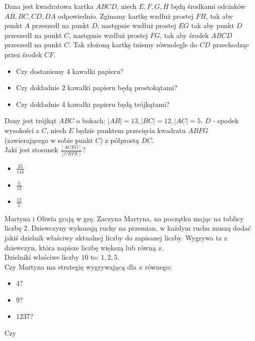 \documentclass[12pt, a4paper]{article}
\newcommand{\question}[1]{\normalitem \begin{samepage}#1 \end{samepage}}
\newcommand{\questionwithasterix}[1]{ \asterixitem \begin{samepage}#1 \vspace{6cm}\end{samepage}}
\begin{document}
\begin{enumerate}
    \question {
        Dana jest kwadratowa kartka $ABCD$, niech $E, F, G, H$ będą środkami odcinków $AB, BC, CD, DA$ odpowiednio.
        Zginamy kartkę wzdłuż prostej $FH$, tak aby punkt $A$ przeszedł na punkt $D$, następnie wzdłuż prostej $EG$ tak aby punkt $D$ przeszedł na punkt $C$, następnie wzdłuż prostej $FG$, tak aby środek $ABCD$ przeszedł na punkt $C$. Tak złożoną kartkę tniemy równolegle do $CD$ przechodząc przez środek $CF$.

		\begin{itemize}
			\item Czy dostaniemy $4$ kawałki papieru?
			\item Czy dokładnie $2$ kawałki papieru będą prostokątami?
			\item Czy dokładnie 4 kawałki papieru będą trójkątami?
		\end{itemize}
	}
	
	\questionwithasterix {
		Dany jest trójkąt $ABC$ o bokach: $|AB| = 13, |BC| = 12, |AC| = 5$. 
        $D$ - spodek wysokości z $C$, niech $E$ będzie punktem przecięcia kwadratu $ABFG$ (zawierającego w sobie punkt $C$) z półprostą $DC$. \\
        Jaki jest stosunek $\frac{[ACEG]}{[CBFE]}$?

		\begin{itemize}
			\item $\frac{25}{144}$
			\item $\frac{5}{12}$
			\item $\frac{12}{5}$
		\end{itemize}
	}
	
	\questionwithasterix{
		Martyna i Oliwia grają w grę.
        Zaczyna Martyna, na początku mając na tablicy liczbę $2$. Dziewczyny wykonują ruchy na przemian, w każdym ruchu muszą dodać jakiś dzielnik właściwy aktualnej liczby do zapisanej liczby. Wygrywa ta z dziewczyn, która napisze liczbę większą lub równą $x$. \\
        Dzielniki właściwe liczby $10$ to: $1, 2, 5$. \\
        Czy Martyna ma strategię wygrywającą dla $x$ równego:

		\begin{itemize}
			\item $4$?
			\item $9$?
			\item $1237$?
		\end{itemize}
	}
	
	\question{
		Czy
		
}
\end{enumerate}
\end{document}
